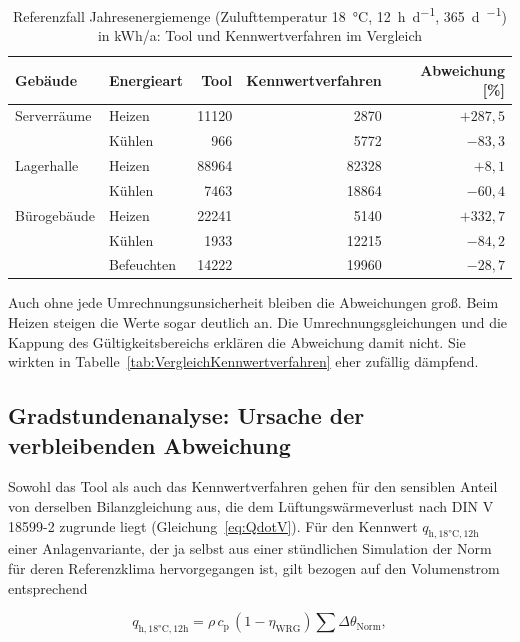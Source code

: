 \documentclass{scrreprt}
\begin{document}
\begin{table}[H]
    \centering
    \caption{Referenzfall Jahresenergiemenge (Zulufttemperatur \SI{18}{\celsius}, \SI{12}{\hour\per\day}, \SI{365}{\day\per\year}) in kWh/a: Tool und Kennwertverfahren im Vergleich}
    \label{tab:Referenzfall}
    \begin{tabular}{llrrr}
        \toprule
        Gebäude & Energieart & Tool & Kennwertverfahren & Abweichung [\%] \\
        \midrule
        Serverräume & Heizen & \num{11120} & \num{2870} & $+287{,}5$ \\
                    & Kühlen & \num{966} & \num{5772} & $-83{,}3$ \\
        \midrule
        Lagerhalle & Heizen & \num{88964} & \num{82328} & $+8{,}1$ \\
                   & Kühlen & \num{7463} & \num{18864} & $-60{,}4$ \\
        \midrule
        Bürogebäude & Heizen & \num{22241} & \num{5140} & $+332{,}7$ \\
                    & Kühlen & \num{1933} & \num{12215} & $-84{,}2$ \\
                    & Befeuchten & \num{14222} & \num{19960} & $-28{,}7$ \\
        \bottomrule
    \end{tabular}
\end{table}

Auch ohne jede Umrechnungsunsicherheit bleiben die Abweichungen groß. Beim Heizen steigen die Werte sogar deutlich an. Die
Umrechnungsgleichungen und die Kappung des Gültigkeitsbereichs
erklären die Abweichung damit nicht. Sie wirkten in
Tabelle~\ref{tab:VergleichKennwertverfahren} eher zufällig dämpfend.

\subsection{Gradstundenanalyse: Ursache der verbleibenden Abweichung}
Sowohl das Tool als auch das Kennwertverfahren gehen für den
sensiblen Anteil von derselben Bilanzgleichung aus, die dem
Lüftungswärmeverlust nach DIN V 18599-2 zugrunde liegt
(Gleichung~\eqref{eq:QdotV}). Für den Kennwert
$q_{\mathrm{h,18°C,12h}}$ einer Anlagenvariante, der ja selbst aus
einer stündlichen Simulation der Norm für deren Referenzklima
hervorgegangen ist, gilt bezogen auf den Volumenstrom entsprechend

\begin{equation}\label{eq:qh_gradstunden}
    q_{\mathrm{h,18°C,12h}} = \rho \, c_{\mathrm{p}} \, (1-\eta_{\mathrm{WRG}}) \sum \Delta\theta_{\mathrm{Norm}},
\end{equation}
\end{document}

